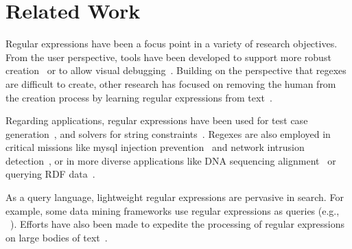\section{Related Work}
\label{sec:related}


Regular expressions have been a focus point in a variety of research objectives. From the user perspective, tools have been developed to support more robust creation~\cite{Spishak:2012:TSR:2318202.2318207} or to allow visual debugging~\cite{Beck:2014:RVD:2591062.2591111}.
Building on the perspective that regexes are difficult to create, other research has focused on removing the human from the creation process by learning regular expressions from  text~\cite{Babbar:2010:CBA:1871840.1871848, Li:2008:REL:1613715.1613719}.

Regarding applications, regular expressions have been used for test case generation~\cite{Ghosh:2013:JAT:2486788.2486925, Galler:2014:STD:2683035.2683100, Anand:2013:OSM:2503903.2503991, Tillmann:2014:TAT:2642937.2642941},  and
solvers for string constraints~\cite{Trinh:2014:SSS:2660267.2660372, hampi}.
Regexes are also employed in critical missions like mysql injection prevention~\cite{Yeole:2011:ADT:1980022.1980229} and network intrusion detection~\cite{network}, or in more diverse applications like DNA sequencing alignment~\cite{1594922} or querying RDF data~\cite{Lee:2010:PSQ:1871871.1871877, Alkhateeb:2009:ESR:1540656.1540975}.


As a query language, lightweight regular expressions are pervasive in search. For example,
some data mining frameworks use regular expressions as queries (e.g., ~\cite{Begel:2010:CDE:1806799.1806821}). Efforts have also been made to expedite the processing of regular expressions on large bodies of text~\cite{Baeza-Yates:1996:FTS:235809.235810}.


